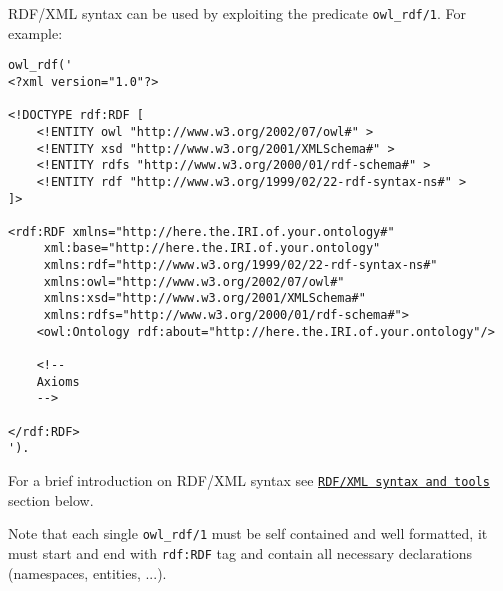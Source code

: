 RDF/XML syntax can be used by exploiting the predicate \verb|owl_rdf/1|. For example:
\begin{verbatim}
owl_rdf('
<?xml version="1.0"?>

<!DOCTYPE rdf:RDF [
    <!ENTITY owl "http://www.w3.org/2002/07/owl#" >
    <!ENTITY xsd "http://www.w3.org/2001/XMLSchema#" >
    <!ENTITY rdfs "http://www.w3.org/2000/01/rdf-schema#" >
    <!ENTITY rdf "http://www.w3.org/1999/02/22-rdf-syntax-ns#" >
]>

<rdf:RDF xmlns="http://here.the.IRI.of.your.ontology#"
     xml:base="http://here.the.IRI.of.your.ontology"
     xmlns:rdf="http://www.w3.org/1999/02/22-rdf-syntax-ns#"
     xmlns:owl="http://www.w3.org/2002/07/owl#"
     xmlns:xsd="http://www.w3.org/2001/XMLSchema#"
     xmlns:rdfs="http://www.w3.org/2000/01/rdf-schema#">
    <owl:Ontology rdf:about="http://here.the.IRI.of.your.ontology"/>

    <!-- 
    Axioms
    -->

</rdf:RDF>
').
\end{verbatim}
For a brief introduction on RDF/XML syntax see \href{rdfxml-syn}{\texttt{RDF/XML syntax and tools}} section below.

Note that each single \verb|owl_rdf/1| must be self contained and well formatted, it must start and end with \verb|rdf:RDF| tag and contain all necessary declarations (namespaces, entities, ...).


